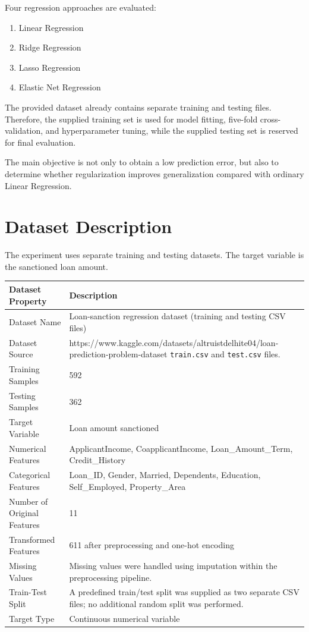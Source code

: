 \documentclass[12pt,a4paper]{article}
\begin{document}
Four regression approaches are evaluated:

\begin{enumerate}
    \item Linear Regression
    \item Ridge Regression
    \item Lasso Regression
    \item Elastic Net Regression
\end{enumerate}

The provided dataset already contains separate training and testing files. Therefore, the supplied training set is used for model fitting, five-fold cross-validation, and hyperparameter tuning, while the supplied testing set is reserved for final evaluation.

The main objective is not only to obtain a low prediction error, but also to determine whether regularization improves generalization compared with ordinary Linear Regression.

\section{Dataset Description}

The experiment uses separate training and testing datasets. The target variable is the sanctioned loan amount.

\begin{longtable}{|p{6cm}|p{8cm}|}
\hline
\textbf{Dataset Property} & \textbf{Description} \\ \hline
Dataset Name & Loan-sanction regression dataset (training and testing CSV files) \\ \hline
Dataset Source & https://www.kaggle.com/datasets/altruistdelhite04/loan-prediction-problem-dataset \texttt{train.csv} and \texttt{test.csv} files. \\ \hline
Training Samples & 592 \\ \hline
Testing Samples & 362 \\ \hline
Target Variable & Loan amount sanctioned \\ \hline
Numerical Features & ApplicantIncome, CoapplicantIncome, Loan\_Amount\_Term, Credit\_History \\ \hline
Categorical Features & Loan\_ID, Gender, Married, Dependents, Education, Self\_Employed, Property\_Area \\ \hline
Number of Original Features & 11 \\ \hline
Transformed Features & 611 after preprocessing and one-hot encoding \\ \hline
Missing Values & Missing values were handled using imputation within the preprocessing pipeline. \\ \hline
Train-Test Split & A predefined train/test split was supplied as two separate CSV files; no additional random split was performed. \\ \hline
Target Type & Continuous numerical variable \\ \hline
\end{longtable}
\end{document}

